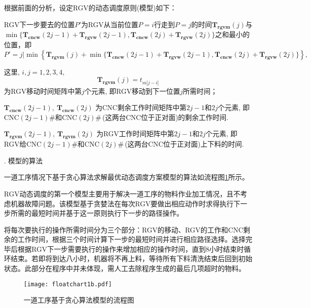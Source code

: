 \documentclass[no-math,withoutpreface,bwprint]{cumcmthesis} %
\numberwithin{equation}{section}
\numberwithin{figure}{section}
\numberwithin{table}{section}
\begin{document}
根据前面的分析，设定RGV的动态调度原则(模型)如下：
\begin{principle}
RGV下一步要去的位置$P'$为RGV从当前位置$P=i$行走到$P=j$的时间$\mathbf{T_{rgvm}}(j)$与$\min\{\mathbf{T_{cncw}}(2j-1)+\mathbf{T_{rgvw}}(2j-1),\mathbf{T_{cncw}}(2j)+\mathbf{T_{rgvw}}(2j)\}$之和最小的位置，即
\begin{equation}
P'=j\Big|\min\left\{\mathbf{T_{rgvm}}(j)+\min\{\mathbf{T_{cncw}}(2j-1)+\mathbf{T_{rgvw}}(2j-1),\mathbf{T_{cncw}}(2j)+\mathbf{T_{rgvw}}(2j)\}\right\},
\end{equation}

这里, $i, j=1,2,3,4,$
\begin{equation}
\mathbf{T_{rgvm}}(j)=t_{m|j-i|}
\end{equation}
为RGV移动时间矩阵中第$j$个元素, 即RGV移动到下一位置$j$所需时间；

$\mathbf{T_{cncw}}(2j-1),\ \mathbf{T_{cncw}}(2j)$ 为CNC剩余工作时间矩阵中第$2j-1$和$2j$个元素, 即CNC$(2j-1)$\#和CNC$(2j)$\#\,{\rm(}这两台CNC位于正对面{\rm)}的剩余工作时间.

$\mathbf{T_{rgvm}}(2j-1),\ \mathbf{T_{rgvm}}(2j)$ 为RGV工作时间矩阵中第$2j-1$和$2j$个元素, 即RGV给CNC$(2j-1)$\#和CNC$(2j)$\#\,{\rm(}这两台CNC位于正对面{\rm)}上下料的时间.

\end{principle}

. 模型的算法

一道工序情况下基于贪心算法求解最优动态调度方案模型的算法如流程图\ref{pro1}所示。

RGV动态调度的第一个模型主要用于解决一道工序的物料作业加工情况，且不考虑机器故障问题。该模型基于贪婪法在每次RGV要做出相应动作时求得执行下一步所需的最短时间并基于这一原则执行下一步的路径操作。

将每次要执行的操作所需时间分为三个部分：RGV的移动、RGV的工作和CNC剩余的工作时间，根据三个时间计算下一步的最短时间并进行相应路径选择。选择完毕后根据RGV下一步需要执行的操作来增加相应的操作时间，直到8小时结束时循环结束。若即将到达八小时，机器将不再上料，等待所有下料清洗结束后回到初始状态。此部分在程序中并未体现，需人工去除程序生成的最后几项超时的物料。

\begin{figure}[!htbp]
     \vspace{-1.2cm}
	\hspace{-1cm}
	\texttt{[image: floatchart1b.pdf]}
	\caption{一道工序基于贪心算法模型的流程图}
     \label{pro1}
\end{figure}
\end{document}
